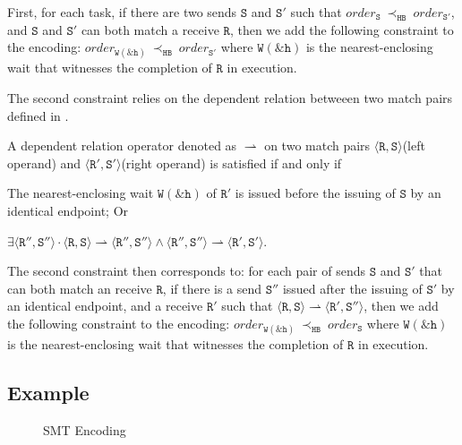 First, for each task, if there are two sends $\mathtt{S}$ and
$\mathtt{S'}$ such that
$\mathit{order}_\mathtt{S}\ \mathrm{\prec_\mathtt{HB}}\ \mathit{order}_\mathtt{S'}$,
and $\mathtt{S}$ and $\mathtt{S'}$ can both match a receive
$\mathtt{R}$, then we add the following constraint to the encoding:
$\mathit{order}_{\mathtt{W(\&h)}}\ \mathrm{\prec_{\mathtt{HB}}}\ \mathit{order}_{\mathtt{S'}}$
where $\mathtt{W(\&h)}$ is the nearest-enclosing wait that witnesses the
completion of $\mathtt{R}$ in execution.

The second constraint relies on the dependent relation betweeen two match pairs defined in .
\begin{definition}
A dependent relation operator denoted as $\rightharpoonup$ on two match pairs $\langle\mathtt{R}, \mathtt{S}\rangle$(left operand) and $\langle\mathtt{R'}, \mathtt{S'}\rangle$(right operand) is satisfied if and only if
\begin{compactenum}
\item The nearest-enclosing wait $\mathtt{W(\&h)}$ of $\mathtt{R'}$ is issued before the issuing of $\mathtt{S}$ by an identical endpoint; Or
\item $\exists\langle\mathtt{R''}, \mathtt{S''}\rangle\cdot\langle\mathtt{R}, \mathtt{S}\rangle \rightharpoonup \langle\mathtt{R''}, \mathtt{S''}\rangle\wedge\langle\mathtt{R''}, \mathtt{S''}\rangle \rightharpoonup \langle\mathtt{R'}, \mathtt{S'}\rangle$.
\end{compactenum}
\label{def:matchrelation}
\end{definition}
The second constraint then corresponds to: for each pair of sends $\mathtt{S}$ and $\mathtt{S'}$ that can both match an receive $\mathtt{R}$, if there is a send $\mathtt{S''}$ issued after the issuing of $\mathtt{S'}$ by an identical endpoint, and a receive $\mathtt{R'}$ such that $\langle\mathtt{R}, \mathtt{S}\rangle\rightharpoonup\langle\mathtt{R'}, \mathtt{S''}\rangle$, then we add the following constraint to the encoding: $\mathit{order}_{\mathtt{W(\&h)}}\ \mathrm{\prec_{\mathtt{HB}}}\ \mathit{order}_{\mathtt{S}}$
where $\mathtt{W(\&h)}$ is the nearest-enclosing wait that witnesses the
completion of $\mathtt{R}$ in execution.


\subsection{Example}

\begin{figure}[t]
\begin{center}
\usebox{\boxSMTc}
\end{center}
\caption{SMT Encoding} \label{fig:smt-encode}
\end{figure}


